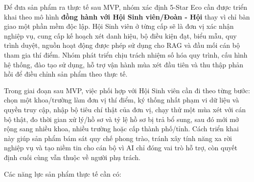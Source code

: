 \noindent Để đưa sản phẩm ra thực tế sau MVP, nhóm xác định 5-Star Eco cần được triển khai theo mô hình \textbf{đồng hành với Hội Sinh viên/Đoàn - Hội} thay vì chỉ bàn giao một phần mềm độc lập. Hội Sinh viên ở từng cấp sẽ là đơn vị xác nhận nghiệp vụ, cung cấp kế hoạch xét danh hiệu, bộ điều kiện đạt, biểu mẫu, quy trình duyệt, nguồn hoạt động được phép sử dụng cho RAG và đầu mối cán bộ tham gia thí điểm. Nhóm phát triển chịu trách nhiệm số hóa quy trình, cấu hình hệ thống, đào tạo sử dụng, hỗ trợ vận hành mùa xét đầu tiên và thu thập phản hồi để điều chỉnh sản phẩm theo thực tế.

\noindent Trong giai đoạn sau MVP, việc phối hợp với Hội Sinh viên cần đi theo từng bước: chọn một khoa/trường làm đơn vị thí điểm, ký thống nhất phạm vi dữ liệu và quyền truy cập, nhập bộ tiêu chí thật của đơn vị, chạy thử một mùa xét với cán bộ thật, đo thời gian xử lý/hồ sơ và tỷ lệ hồ sơ bị trả bổ sung, sau đó mới mở rộng sang nhiều khoa, nhiều trường hoặc cấp thành phố/tỉnh. Cách triển khai này giúp sản phẩm bám sát quy chế phong trào, tránh xây tính năng xa rời nghiệp vụ và tạo niềm tin cho cán bộ vì AI chỉ đóng vai trò hỗ trợ, còn quyết định cuối cùng vẫn thuộc về người phụ trách.

\noindent Các năng lực sản phẩm thực tế cần có:

